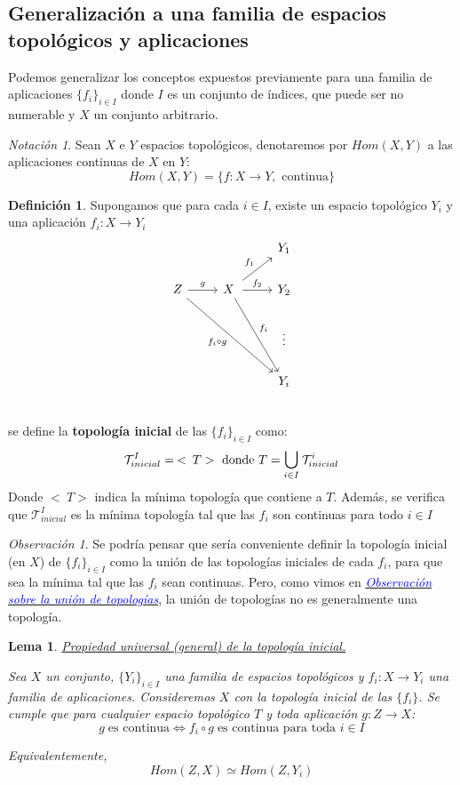 \documentclass[12pt,twoside]{report}
\newcommand\mc[1]{\mathcal{#1}}
\theoremstyle{azul}
\theoremstyle{azul2}
\theoremstyle{plain}
\newtheorem*{lem}{Lema}
\theoremstyle{definition}
\newtheorem*{defi}{Definición}
\theoremstyle{remark}
\newtheorem*{obs}{Observación}
\newtheorem*{nota}{Notación}
\begin{document}
\subsection{Generalización a una familia de espacios topológicos y aplicaciones}
Podemos generalizar los conceptos expuestos previamente para una familia de aplicaciones $\{f_i\}_{i\in I}$ donde $I$ es un conjunto de índices, que puede ser no numerable y $X$ un conjunto arbitrario.
\begin{nota}
Sean $X$ e $Y$ espacios topológicos, denotaremos por $Hom(X,Y)$ a las aplicaciones continuas de $X$ en $Y$:
$$Hom(X,Y)=\{f: X \longrightarrow Y, \text{ continua}\}$$
\end{nota}
\begin{defi}
Supongamos que para cada $i \in I$, existe un espacio topológico $Y_i$ y una aplicación $f_i: X \longrightarrow Y_i$ 
$$\begin{tikzcd}
   &   & Y_1 \\
Z \arrow{r}{g} \arrow{rrdd}[swap]{f_i \circ g} & X \: \arrow{r}{f_2} \arrow{ru}{f_1} \arrow {rdd}{f_i}   & Y_2 \\
& & \vdots  \\
 & & Y_i  \\
\end{tikzcd}
$$
se define la \textbf{topología inicial} de las $\{f_i\}_{i\in I}$ como: 
$$\mc{T}_{inicial}^I = \: <\:T> \text{ donde } T = \underset{i \in I}{\mathlarger{\bigcup}} \: \mc{T}_{inicial}^i$$
Donde $<\: T>$ indica la mínima topología que contiene a $T$.
Además, se verifica que $\mc{T}_{inicial}^I$ es la mínima topología tal que las $f_i$ son continuas para todo $i\in I$
\end{defi}
\begin{obs}
Se podría pensar que sería conveniente definir la topología inicial (en $X$) de $\{ f_i \}_{i \in I}$ como la unión de las topologías iniciales de cada $f_i$, para que sea la m{\'i}nima tal que las $f_i$ sean continuas. Pero, como vimos en \hyperref[uniontop]{\textcolor{blue}{\textit{Observaci{\'o}n sobre la uni{\'o}n de topolog{\'i}as}}}, la uni{\'o}n de topolog{\'i}as no es generalmente una topolog{\'i}a. 
\end{obs}
\begin{lem} \underline{Propiedad universal (general) de la topología inicial.}

Sea $X$ un conjunto, $\{Y_i\}_{i \in I}$ una familia de espacios topológicos y $f_i:X\longrightarrow Y_i$ una familia de aplicaciones. Consideremos $X$ con la topología inicial de las $\{f_i\}$. Se cumple que para cualquier espacio topológico $T$ y toda aplicación $g:Z\longrightarrow X$:
$$g \; \text{es continua} \iff f_i\circ g\;\text{es continua para toda }i\in I$$

Equivalentemente, $$Hom(Z,X) \simeq Hom (Z,Y_i)$$
\end{lem}
\end{document}
